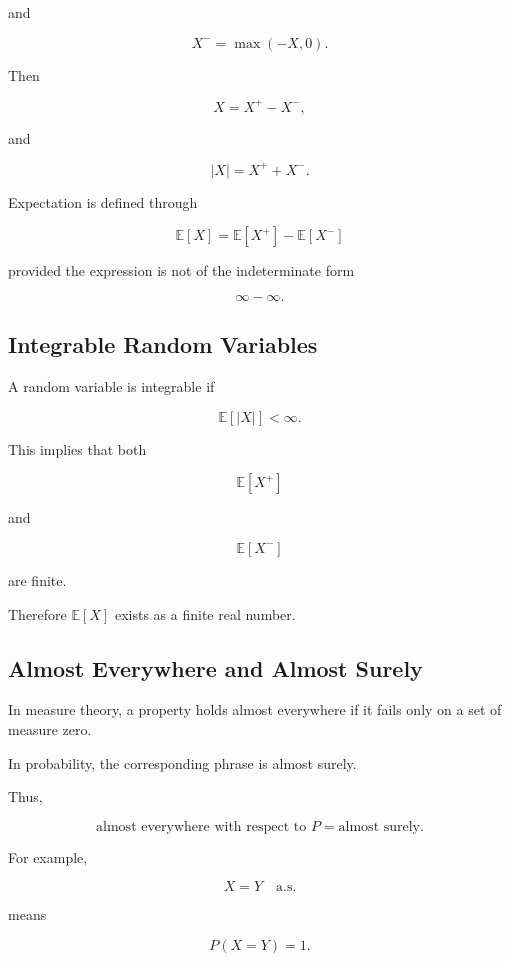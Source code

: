 and

\[
\boxed{
X^-
=
\max(-X,0).
}
\]

Then

\[
X
=
X^+-X^-,
\]

and

\[
|X|
=
X^++X^-.
\]

Expectation is defined through

\[
\boxed{
\mathbb{E}[X]
=
\mathbb{E}[X^+]
-
\mathbb{E}[X^-]
}
\]

provided the expression is not of the indeterminate form

\[
\infty-\infty.
\]

\subsection{Integrable Random Variables}
\label{subsec:integrable-random-variables}

A random variable is integrable if

\[
\boxed{
\mathbb{E}[|X|]<\infty.
}
\]

This implies that both

\[
\mathbb{E}[X^+]
\]

and

\[
\mathbb{E}[X^-]
\]

are finite.

Therefore \(\mathbb{E}[X]\) exists as a finite real number.

\subsection{Almost Everywhere and Almost Surely}
\label{subsec:ae-as}

In measure theory, a property holds almost everywhere if it fails only
on a set of measure zero.

In probability, the corresponding phrase is almost surely.

Thus,

\[
\boxed{
\text{almost everywhere with respect to }P
=
\text{almost surely}.
}
\]

For example,

\[
X=Y
\quad\text{a.s.}
\]

means

\[
\boxed{
P(X=Y)=1.
}
\]

